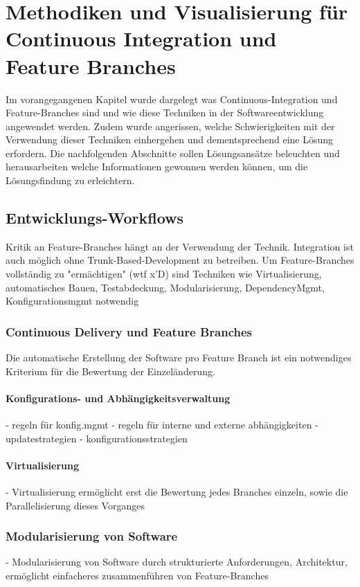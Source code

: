 \chapter{Methodiken und Visualisierung für Continuous Integration und Feature Branches}
\label{ch:visu_meth}

Im vorangegangenen Kapitel wurde dargelegt was Continuous-Integration und Feature-Branches sind und wie diese Techniken in der Softwareentwicklung angewendet werden. Zudem wurde angerissen, welche Schwierigkeiten mit der Verwendung dieser Techniken einhergehen und dementsprechend eine Lösung erfordern. 
Die nachfolgenden Abschnitte sollen Lösungsansätze beleuchten und herausarbeiten welche Informationen gewonnen werden können, um die Lösungsfindung zu erleichtern.

\section{Entwicklungs-Workflows}

Kritik an Feature-Branches hängt an der Verwendung der Technik. Integration ist auch möglich ohne Trunk-Based-Development zu betreiben. Um Feature-Branches vollständig zu "ermächtigen" (wtf x'D) sind Techniken wie Virtualisierung, automatisches Bauen, Testabdeckung, Modularisierung, DependencyMgmt, Konfigurationsmgmt notwendig

\subsection{Continuous Delivery und Feature Branches}

Die automatische Erstellung der Software pro Feature Branch ist ein notwendiges Kriterium für die Bewertung der Einzeländerung.

\subsubsection{Konfigurations- und Abhängigkeitsverwaltung}
- regeln für konfig.mgmt
- regeln für interne und externe abhängigkeiten
- updatestrategien
- konfigurationsstrategien
\subsubsection{Virtualisierung}
- Virtualisierung ermöglicht erst die Bewertung jedes Branches einzeln, sowie die Parallelisierung dieses Vorganges
\subsection{Modularisierung von Software}
- Modularisierung von Software durch strukturierte Anforderungen, Architektur, ermöglicht einfacheres zusammenführen von Feature-Branches
